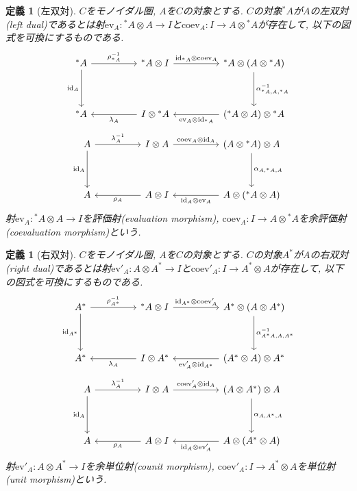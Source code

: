 \documentclass[a4paper,12pt]{ltjsarticle}
\theoremstyle{break}
\newtheorem{defn}[thm]{定義}
\newcommand{\id}{\mathrm{id}}
\newcommand{\eva}{\mathrm{ev}}
\newcommand{\coev}{\mathrm{coev}}
\newcommand{\al}{\alpha}
\newcommand{\la}{\lambda}
\newcommand{\ot}{\otimes}
\numberwithin{equation}{section}
\begin{document}
\begin{defn}[左双対]
  $C$をモノイダル圏, $A$を$C$の対象とする. 
  $C$の対象${}^*A$が$A$の左双対(left dual)であるとは射$\eva_A: {}^*A \ot A \to I$と$\coev_A: I \to A \ot {}^*A$が存在して, 以下の図式を可換にするものである. 
  \[\begin{tikzcd}
    {}^*A && {{}^*A \ot I} && {{}^*A \ot (A \ot {}^*A)} \\
    \\
    {}^*A && {I \ot {}^*A} && {({}^*A \ot A) \ot {}^*A}
    \arrow["{\rho_{{}^*A}^{-1}}", from=1-1, to=1-3]
    \arrow["{\id_{{}^*A} \ot \coev_A}", from=1-3, to=1-5]
    \arrow["{\id_A}"', from=1-1, to=3-1]
    \arrow["{\la_A}", from=3-3, to=3-1]
    \arrow["{\eva_A \ot \id_{{}^*A}}", from=3-5, to=3-3]
    \arrow["{\al_{{}^*A,A,{}^*A}^{-1}}", from=1-5, to=3-5]
  \end{tikzcd}\]
  \[\begin{tikzcd}
    A && {I \ot A} && {(A \ot {}^*A) \ot A} \\
    \\
    A && {A \ot I} && {A \ot ({}^*A \ot A)}
    \arrow["{\la_A^{-1}}", from=1-1, to=1-3]
    \arrow["{\coev_A \ot \id_A }", from=1-3, to=1-5]
    \arrow["{\id_A}"', from=1-1, to=3-1]
    \arrow["{\rho_A}", from=3-3, to=3-1]
    \arrow["{\id_A \ot \eva_A}", from=3-5, to=3-3]
    \arrow["{\al_{A,{}^*A,A}}", from=1-5, to=3-5]
  \end{tikzcd}\]
  射$\eva_A: {}^*A \ot A \to I$を評価射(evaluation morphism), $\coev_A: I \to A \ot {}^*A$を余評価射(coevaluation morphism)という. 
\end{defn}

\begin{defn}[右双対]
  $C$をモノイダル圏, $A$を$C$の対象とする. 
  $C$の対象$A^*$が$A$の右双対(right dual)であるとは射$\eva'_A: A \ot A^* \to I$と$\coev'_A: I \to A^* \ot A$が存在して, 以下の図式を可換にするものである. 
  \[\begin{tikzcd}
    A^* && {{}^*A \ot I} && {A^* \ot (A \ot A^*)} \\
    \\
    A^* && {I \ot A^*} && {(A^* \ot A) \ot A^*}
    \arrow["{\rho_{A^*}^{-1}}", from=1-1, to=1-3]
    \arrow["{\id_{A^*} \ot \coev'_A}", from=1-3, to=1-5]
    \arrow["{\id_{A^*}}"', from=1-1, to=3-1]
    \arrow["{\la_A}", from=3-3, to=3-1]
    \arrow["{\eva'_A \ot \id_{A^*}}", from=3-5, to=3-3]
    \arrow["{\al_{A^*A,A,A^*}^{-1}}", from=1-5, to=3-5]
  \end{tikzcd}\]
  \[\begin{tikzcd}
    A && {I \ot A} && {(A \ot A^*) \ot A} \\
    \\
    A && {A \ot I} && {A \ot (A^* \ot A)}
    \arrow["{\la_A^{-1}}", from=1-1, to=1-3]
    \arrow["{\coev'_A \ot \id_A}", from=1-3, to=1-5]
    \arrow["{\id_A}"', from=1-1, to=3-1]
    \arrow["{\rho_A}", from=3-3, to=3-1]
    \arrow["{\id_A \ot \eva'_A}", from=3-5, to=3-3]
    \arrow["{\al_{A,A^*,A}}", from=1-5, to=3-5]
  \end{tikzcd}\]
  射$\eva'_A: A \ot A^* \to I$を余単位射(counit morphism), $\coev'_A: I \to A^* \ot A$を単位射(unit morphism)という. 
\end{defn}
\end{document}
